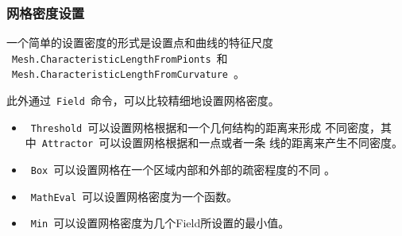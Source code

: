 \documentclass[a4paper,  11pt]{ctexart}
\begin{document}
\subsubsection{网格密度设置}
一个简单的设置密度的形式是设置点和曲线的特征尺度
~\verb|Mesh.CharacteristicLengthFromPionts|~和
~\verb|Mesh.CharacteristicLengthFromCurvature|~。 \par
此外通过~\verb|Field|~命令，可以比较精细地设置网格密度。
\begin{itemize}
	\item ~\verb|Threshold|~可以设置网格根据和一个几何结构的距离来形成
		不同密度，其中~\verb|Attractor|~可以设置网格根据和一点或者一条
		线的距离来产生不同密度。
	\item ~\verb|Box|~可以设置网格在一个区域内部和外部的疏密程度的不同
		。
	\item ~\verb|MathEval|~可以设置网格密度为一个函数。
	\item ~\verb|Min|~可以设置网格密度为几个Field所设置的最小值。
\end{itemize}
\end{document}
